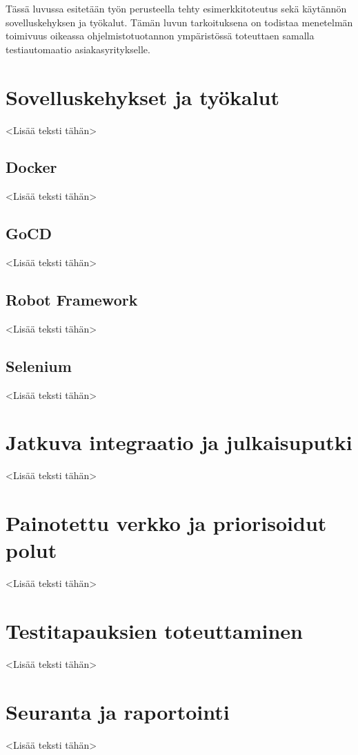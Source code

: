 Tässä luvussa esitetään työn perusteella tehty esimerkkitoteutus sekä käytännön sovelluskehyksen ja työkalut.
Tämän luvun tarkoituksena on todistaa menetelmän toimivuus oikeassa ohjelmistotuotannon ympäristössä toteuttaen samalla testiautomaatio asiakasyritykselle.

\section{Sovelluskehykset ja työkalut}

<Lisää teksti tähän>

  \subsection{Docker}

  <Lisää teksti tähän>

  \subsection{GoCD}

  <Lisää teksti tähän>

  \subsection{Robot Framework}

  <Lisää teksti tähän>

  \subsection{Selenium}

  <Lisää teksti tähän>

\section{Jatkuva integraatio ja julkaisuputki}

<Lisää teksti tähän>

\section{Painotettu verkko ja priorisoidut polut}

<Lisää teksti tähän>

\section{Testitapauksien toteuttaminen}

<Lisää teksti tähän>

\section{Seuranta ja raportointi}

<Lisää teksti tähän>
